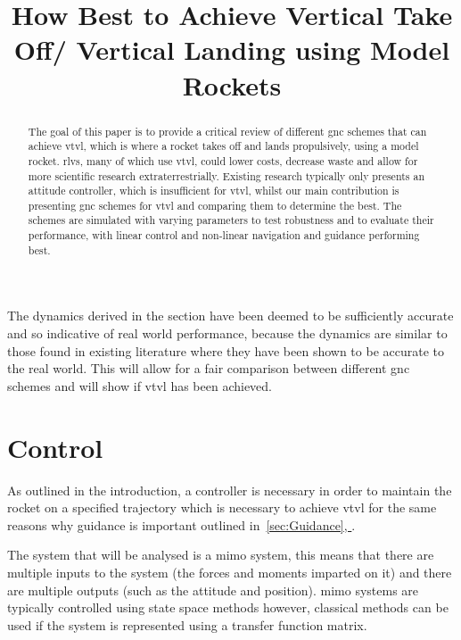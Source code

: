 \documentclass{article}
\title{How Best to Achieve Vertical Take Off/ Vertical Landing using Model Rockets}
\author{}
\newcommand*{\fullrefnocomma}[1]{\hyperref[{#1}]{\autoref*{#1}, \nameref*{#1}}} %
\begin{document}
\maketitle

\begingroup
\hypersetup{linkcolor=black}
\tableofcontents
\endgroup

\newpage

\printunsrtglossary[type=notation]
\printunsrtglossary[type=operators]

\newpage
\begin{abstract}
  The goal of this paper is to provide a critical review of different \gls{gnc} schemes that can achieve \gls{vtvl}, which is where a rocket takes off and lands propulsively, using a model rocket.
  \Glspl{rlv}, many of which use \gls{vtvl}, could lower costs, decrease waste and allow for more scientific research extraterrestrially. 
  Existing research typically only presents an  \gls{attitude} controller, which is insufficient for \gls{vtvl}, whilst our main contribution is presenting \gls{gnc} schemes for \gls{vtvl} and comparing them to determine the best.
  The schemes are simulated with varying parameters to test robustness and to evaluate their performance, with linear control and non-linear navigation and guidance performing best.
\end{abstract}
%

%


%


%
The dynamics derived in the section have been deemed to be sufficiently accurate and so indicative of real world performance, because the dynamics are similar to those found in existing literature where they have been shown to be accurate to the real world. This will allow for a fair comparison between different \gls{gnc} schemes and will show if \gls{vtvl} has been achieved.
%

%

%

%
\section{Control} 
\label{sec:Control}
As outlined in the introduction, a controller is necessary in order to maintain the rocket on a specified trajectory which is necessary to achieve \gls{vtvl} for the same reasons why guidance is important outlined in~\fullrefnocomma{sec:Guidance}.

The system that will be analysed is a \gls{mimo} system, this means that there are multiple inputs to the system (the forces and moments imparted on it) and there are multiple outputs (such as the \gls{attitude} and position).
\gls{mimo} systems are typically controlled using state space methods however, classical methods can be used if the system is represented using a transfer function matrix.
\end{document}
